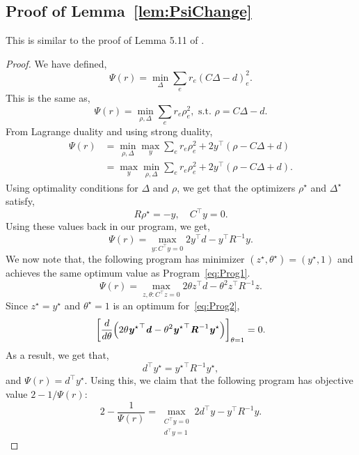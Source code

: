 \documentclass[11pt]{article}
\let\originalleft\left
\let\originalright\right
\renewcommand{\left}{\mathopen{}\mathclose\bgroup\originalleft}
\renewcommand{\right}{\aftergroup\egroup\originalright}
\newcommand\dd{\boldsymbol{\mathit{d}}}
\newcommand\rr{\boldsymbol{\mathit{r}}}
\newcommand\yy{\boldsymbol{\mathit{y}}}
\newcommand\zz{\boldsymbol{\mathit{z}}}
\newcommand\CC{\boldsymbol{\mathit{C}}}
\newcommand\RR{\boldsymbol{\mathit{R}}}
\begin{document}
\subsection*{Proof of Lemma~\ref{lem:PsiChange}} 
This is similar to the proof of Lemma 5.11 of \cite{adil2019iterative}.

\begin{proof}
    We have defined,
    \[
    \Psi(\rr) = \min_{\Delta}\sum_e \rr_e (\CC\Delta-\dd)_e^2.
    \]
    This is the same as,
    \[
    \Psi(\rr) = \min_{\rho,\Delta}\sum_e \rr_e \rho_e^2, \text{ s.t. } \rho = \CC\Delta-\dd.
    \] 
    From Lagrange duality and using strong duality,
    \begin{align*}
    \Psi(\rr) & = \min_{\rho,\Delta} \max_{\yy}\sum_e \rr_e \rho_e^2 + 2\yy^{\top}(\rho - \CC\Delta +\dd) \\
    & = \max_{\yy}\min_{\rho,\Delta}\sum_e \rr_e \rho_e^2 + 2\yy^{\top}(\rho - \CC\Delta +\dd).
    \end{align*}
    Using optimality conditions for $\Delta$ and $\rho$, we get that the optimizers $\rho^{\star}$ and $\Delta^{\star}$ satisfy,
    \[
    \RR \rho^{\star} = - \yy, \quad \CC^{\top}\yy = 0.
    \]
    Using these values back in our program, we get,
    \begin{equation}\label{eq:Prog1}
    \Psi(\rr) = \max_{\yy: \CC^{\top}\yy = 0} 2\yy^{\top}\dd - \yy^{\top}\RR^{-1}\yy.
    \end{equation}
    We now note that, the following program has minimizer $(\zz^{\star},\theta^{\star}) = (\yy^{\star},1)$ and achieves the same optimum value as Program~\ref{eq:Prog1}.
    \begin{equation}\label{eq:Prog2}
        \Psi(\rr) = \max_{\zz,\theta: \CC^{\top}\zz = 0} 2\theta\zz^{\top}\dd - \theta^2 \zz^{\top}\RR^{-1}\zz.
    \end{equation}
    Since $\zz^{\star} = \yy^{\star}$ and $\theta^{\star} = 1$ is an optimum for~\eqref{eq:Prog2},
    \[
    \left[\frac{d}{d\theta}\left(2\theta{\yy^{\star}}^{\top}\dd - \theta^2 {\yy^{\star}}^{\top}\RR^{-1}\yy^{\star}\right)\right]_{\theta=1} = 0.
    \]
    As a result, we get that,
    \[
    \dd^{\top}\yy^{\star} = {\yy^{\star}}^{\top}\RR^{-1}\yy^{\star},
    \]
    and $\Psi(\rr) = \dd^{\top}\yy^{\star}$. Using this, we claim that the following program has objective value $2 - 1/\Psi(\rr)$:
    \[
    2 - \frac{1}{\Psi(\rr)} = \max_{\substack{\CC^{\top}\yy = 0\\ \dd^{\top}\yy = 1}} 2 \dd^{\top}\yy - \yy^{\top}\RR^{-1}\yy.
    \]

\end{proof}
\end{document}
